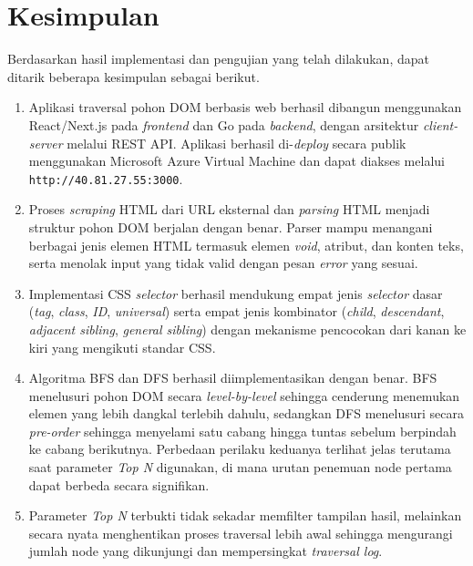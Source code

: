 \section{Kesimpulan}
 
Berdasarkan hasil implementasi dan pengujian yang telah dilakukan, dapat ditarik beberapa kesimpulan sebagai berikut.
 
\begin{enumerate}
    \item Aplikasi traversal pohon DOM berbasis web berhasil dibangun menggunakan React/Next.js pada \textit{frontend} dan Go pada \textit{backend}, dengan arsitektur \textit{client-server} melalui REST API. Aplikasi berhasil di-\textit{deploy} secara publik menggunakan Microsoft Azure Virtual Machine dan dapat diakses melalui \texttt{http://40.81.27.55:3000}.
 
    \item Proses \textit{scraping} HTML dari URL eksternal dan \textit{parsing} HTML menjadi struktur pohon DOM berjalan dengan benar. Parser mampu menangani berbagai jenis elemen HTML termasuk elemen \textit{void}, atribut, dan konten teks, serta menolak input yang tidak valid dengan pesan \textit{error} yang sesuai.
 
    \item Implementasi CSS \textit{selector} berhasil mendukung empat jenis \textit{selector} dasar (\textit{tag}, \textit{class}, \textit{ID}, \textit{universal}) serta empat jenis kombinator (\textit{child}, \textit{descendant}, \textit{adjacent sibling}, \textit{general sibling}) dengan mekanisme pencocokan dari kanan ke kiri yang mengikuti standar CSS.
 
    \item Algoritma BFS dan DFS berhasil diimplementasikan dengan benar. BFS menelusuri pohon DOM secara \textit{level-by-level} sehingga cenderung menemukan elemen yang lebih dangkal terlebih dahulu, sedangkan DFS menelusuri secara \textit{pre-order} sehingga menyelami satu cabang hingga tuntas sebelum berpindah ke cabang berikutnya. Perbedaan perilaku keduanya terlihat jelas terutama saat parameter \textit{Top N} digunakan, di mana urutan penemuan node pertama dapat berbeda secara signifikan.
 
    \item Parameter \textit{Top N} terbukti tidak sekadar memfilter tampilan hasil, melainkan secara nyata menghentikan proses traversal lebih awal sehingga mengurangi jumlah node yang dikunjungi dan mempersingkat \textit{traversal log}.
 

\end{enumerate}
